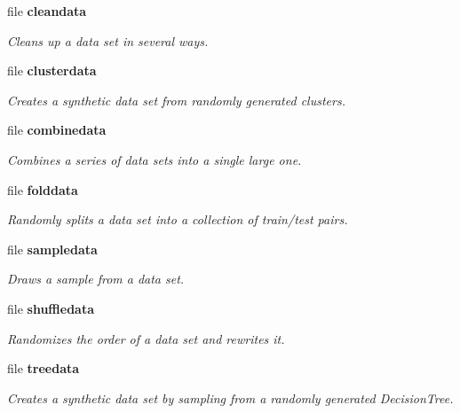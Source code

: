 \begin{CompactItemize}
\item 
file {\bf cleandata}
\begin{CompactList}\small\item\em Cleans up a data set in several ways. \item\end{CompactList}

\item 
file {\bf clusterdata}
\begin{CompactList}\small\item\em Creates a synthetic data set from randomly generated clusters. \item\end{CompactList}

\item 
file {\bf combinedata}
\begin{CompactList}\small\item\em Combines a series of data sets into a single large one. \item\end{CompactList}

\item 
file {\bf folddata}
\begin{CompactList}\small\item\em Randomly splits a data set into a collection of train/test pairs. \item\end{CompactList}

\item 
file {\bf sampledata}
\begin{CompactList}\small\item\em Draws a sample from a data set. \item\end{CompactList}

\item 
file {\bf shuffledata}
\begin{CompactList}\small\item\em Randomizes the order of a data set and rewrites it. \item\end{CompactList}

\item 
file {\bf treedata}
\begin{CompactList}\small\item\em Creates a synthetic data set by sampling from a randomly generated Decision\-Tree. \item\end{CompactList}


\end{CompactItemize}
